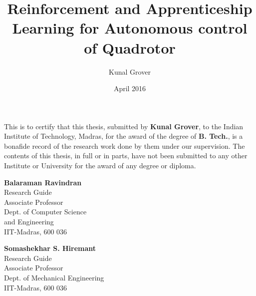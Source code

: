 \documentclass[hidelinks,BTech]{iitmdiss}
\begin{document}
\graphicspath{{images/}	}

\title{Reinforcement and Apprenticeship Learning for Autonomous control of Quadrotor}

\author{Kunal Grover}

\date{April 2016}

\maketitle

\certificate

\vspace*{0.5in}

\noindent This is to certify that this thesis, submitted by {\bf Kunal Grover}, to the Indian Institute of Technology, Madras, for the award of the degree of {\bf B. Tech.}, is a bonafide record of the research work done by them under our supervision. The contents of this thesis, in full or in parts, have not been submitted to any other Institute or University for the award of any degree or diploma.

\vspace*{1.5in}

\begin{singlespacing}

\begin{minipage}[t]{0.45\textwidth}
  {\bf Balaraman Ravindran} \\
  Research Guide \\
  Associate Professor \\
  Dept. of Computer Science \\
  and Engineering \\
  IIT-Madras, 600 036
\end{minipage}
\hfill
\begin{minipage}[t]{0.45\textwidth}
  {\bf Somashekhar S. Hiremant} \\
  Research Guide \\
  Associate Professor \\
  Dept. of Mechanical Engineering \\
  IIT-Madras, 600 036
\end{minipage}

\end{singlespacing}
\end{document}
